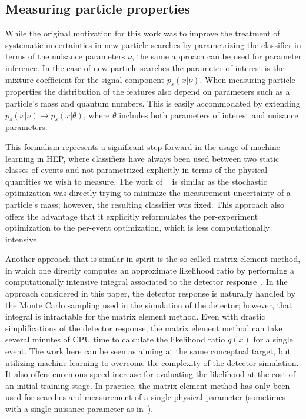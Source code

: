 \documentclass[12pt]{article}
\numberwithin{equation}{section}
\theoremstyle{plain}
\begin{document}
\subsection{Measuring particle properties}

While the original motivation for this work was to improve the treatment of systematic uncertainties in new particle searches by parametrizing the classifier in terms of the nuisance parameters $\nu$, the same approach can be used for parameter inference. In the case of new particle searches the parameter of interest is the mixture coefficient for the signal component $p_s(x|\nu)$. When measuring particle properties the distribution of the features also depend on parameters such as a particle's mass and quantum numbers. This is easily accommodated by extending $p_s(x|\nu) \to p_s(x|\theta)$, where $\theta$ includes both parameters of interest and nuisance parameters.

This formalism represents a significant step forward in the usage of machine learning in HEP, where classifiers have always been used between two static classes of events and not parametrized explicitly in terms of the physical quantities we wish to measure. The work of  ~\citep{Whiteson:2006ws} is similar as the stochastic optimization was directly trying to minimize the measurement uncertainty of a particle's mass; however, the resulting classifier was fixed. This approach also offers the advantage that it explicitly reformulates the per-experiment optimization to the per-event optimization, which is less computationally intensive.

Another approach that is similar in spirit is the so-called matrix element method, in which one  directly computes an approximate likelihood ratio by performing a computationally intensive integral associated to the detector response~\citep{Volobouev:2011vb}. In the approach considered in this paper, the detector response is naturally handled by the Monte Carlo sampling used in the simulation of the detector; however, that integral is intractable for the matrix element method. Even with drastic simplifications of the detector response, the matrix element method can take several minutes of CPU time to calculate the likelihood ratio $q(x)$ for a single event. The work here can be seen as aiming at the same conceptual target, but utilizing machine learning to overcome the complexity of the detector simulation. It also offers enormous speed increase for evaluating the likelihood at the cost of an initial training stage. In practice, the matrix element method has only been used for searches and measurement of a single physical parameter (sometimes with a single nuisance parameter as in~\citep{Aaltonen:2010yz}).
\end{document}
